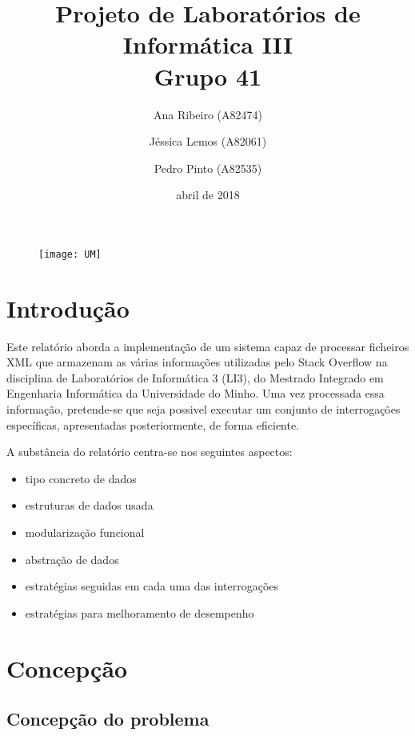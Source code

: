 \documentclass[10pt,a4paper]{article}
\title{\bf{\textcolor{Mahogany}{Projeto de Laboratórios de Informática III}\\Grupo 41}}
\author{ Ana Ribeiro (A82474) \and Jéssica Lemos (A82061) \and Pedro Pinto (A82535)}
\date{abril de 2018}
\begin{document}
\graphicspath{ {/home/jessica/Desktop/} }
\begin{figure}[t]
    \centering
	\center\texttt{[image: UM]}\\
\end{figure}

\maketitle
\thispagestyle{empty}
\cleardoublepage

\thispagestyle{empty}
\tableofcontents
\cleardoublepage
{}
\setcounter {page}{1}

\section{Introdução}

Este relatório aborda a implementação de um sistema capaz de processar ficheiros XML que armazenam as várias informações utilizadas pelo Stack Overflow na disciplina de Laboratórios de Informática 3 (LI3), do Mestrado Integrado em Engenharia Informática da Universidade do Minho. Uma vez processada essa informação, pretende-se que seja possivel executar um conjunto de interrogações específicas, apresentadas posteriormente, de forma eficiente.

A substância do relatório centra-se nos seguintes aspectos:
\begin{itemize}
 \item tipo concreto de dados
 \item estruturas de dados usada
 \item modularização funcional
 \item abstração de dados
 \item estratégias seguidas em cada uma das interrogações
 \item estratégias para melhoramento de desempenho
\end{itemize}

\cleardoublepage

\section{Concepção}
\label{sec:solucao}

\subsection{Concepção do problema}
\end{document}
